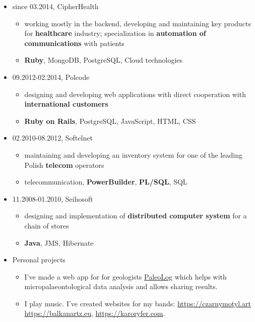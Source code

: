\documentclass[a4paper]{article}
\begin{document}
\begin{itemize}
  \item
  since 03.2014,
  CipherHealth
  \begin{itemize}
    \item
      working mostly in the backend, developing and maintaining key products for \textbf{healthcare} industry; specialization in \textbf{automation of communications} with patients
    \item
      \textbf{Ruby}, MongoDB, PostgreSQL, Cloud technologies
  \end{itemize}
  \item
    09.2012-02.2014,
    Polcode
    \begin{itemize}
      \item
        designing and developing web applications with direct cooperation with \textbf{international customers}
      \item
        \textbf{Ruby on Rails}, PostgreSQL, JavaScript, HTML, CSS
    \end{itemize}
  \item
    02.2010-08.2012,
    Softelnet
    \begin{itemize}
      \item
        maintaining and developing an inventory system
        for one of the leading Polish \textbf{telecom} operators
      \item
        telecommunication, \textbf{PowerBuilder}, \textbf{PL/SQL}, SQL
    \end{itemize}
  \item
    11.2008-01.2010,
    Seihosoft
    \begin{itemize}
      \item
        designing and implementation of \textbf{distributed computer system}
        for a chain of stores
      \item
        \textbf{Java}, JMS, Hibernate
    \end{itemize}
  \item
    Personal projects
    \begin{itemize}
      \item
        I've made a web app for for geologists \href{https://github.com/mradmacher/paleolog}{PaleoLog} which helps with micropalaeontological data analysis and allows sharing results.
      \item
        I play music. I've created websites for my bands: \href{https://czarnymotyl.art}{https://czarnymotyl.art} \href{https://balkanartz.eu}{https://balkanartz.eu}, \href{https://karoryfer.com}{https://karoryfer.com}.
    \end{itemize}
\end{itemize}
\end{document}

